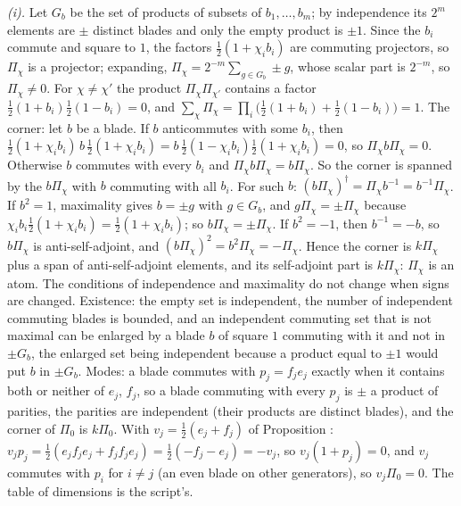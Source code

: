 \emph{(i).} Let $G_{b}$ be the set of products of subsets of $b_{1}, \dots, b_{m}$; by independence its $2^{m}$ elements are $\pm$ distinct blades and only the empty product is $\pm 1$. Since the $b_{i}$ commute and square to $1$, the factors $\tfrac12(1 + \chi_{i}b_{i})$ are commuting projectors, so $\Pi_{\chi}$ is a projector; expanding, $\Pi_{\chi} = 2^{-m}\sum_{g \in G_{b}}\pm g$, whose scalar part is $2^{-m}$, so $\Pi_{\chi} \ne 0$. For $\chi \ne \chi'$ the product $\Pi_{\chi}\Pi_{\chi'}$ contains a factor $\tfrac12(1 + b_{i})\tfrac12(1 - b_{i}) = 0$, and $\sum_{\chi}\Pi_{\chi} = \prod_{i}\bigl(\tfrac12(1 + b_{i}) + \tfrac12(1 - b_{i})\bigr) = 1$. The corner: let $b$ be a blade. If $b$ anticommutes with some $b_{i}$, then $\tfrac12(1 + \chi_{i}b_{i})\,b\,\tfrac12(1 + \chi_{i}b_{i}) = b\,\tfrac12(1 - \chi_{i}b_{i})\tfrac12(1 + \chi_{i}b_{i}) = 0$, so $\Pi_{\chi}b\Pi_{\chi} = 0$. Otherwise $b$ commutes with every $b_{i}$ and $\Pi_{\chi}b\Pi_{\chi} = b\Pi_{\chi}$. So the corner is spanned by the $b\Pi_{\chi}$ with $b$ commuting with all $b_{i}$. For such $b$: $(b\Pi_{\chi})^{\dagger} = \Pi_{\chi}b^{-1} = b^{-1}\Pi_{\chi}$. If $b^{2} = 1$, maximality gives $b = \pm g$ with $g \in G_{b}$, and $g\Pi_{\chi} = \pm\Pi_{\chi}$ because $\chi_{i}b_{i}\tfrac12(1 + \chi_{i}b_{i}) = \tfrac12(1 + \chi_{i}b_{i})$; so $b\Pi_{\chi} = \pm\Pi_{\chi}$. If $b^{2} = -1$, then $b^{-1} = -b$, so $b\Pi_{\chi}$ is anti-self-adjoint, and $(b\Pi_{\chi})^{2} = b^{2}\Pi_{\chi} = -\Pi_{\chi}$. Hence the corner is $k\Pi_{\chi}$ plus a span of anti-self-adjoint elements, and its self-adjoint part is $k\Pi_{\chi}$: $\Pi_{\chi}$ is an atom. The conditions of independence and maximality do not change when signs are changed. Existence: the empty set is independent, the number of independent commuting blades is bounded, and an independent commuting set that is not maximal can be enlarged by a blade $b$ of square $1$ commuting with it and not in $\pm G_{b}$, the enlarged set being independent because a product equal to $\pm 1$ would put $b$ in $\pm G_{b}$. Modes: a blade commutes with $p_{j} = f_{j}e_{j}$ exactly when it contains both or neither of $e_{j}$, $f_{j}$, so a blade commuting with every $p_{j}$ is $\pm$ a product of parities, the parities are independent (their products are distinct blades), and the corner of $\Pi_{0}$ is $k\Pi_{0}$. With $v_{j} = \tfrac12(e_{j} + f_{j})$ of Proposition : $v_{j}p_{j} = \tfrac12(e_{j}f_{j}e_{j} + f_{j}f_{j}e_{j}) = \tfrac12(-f_{j} - e_{j}) = -v_{j}$, so $v_{j}(1 + p_{j}) = 0$, and $v_{j}$ commutes with $p_{i}$ for $i \ne j$ (an even blade on other generators), so $v_{j}\Pi_{0} = 0$. The table of dimensions is the script's.

